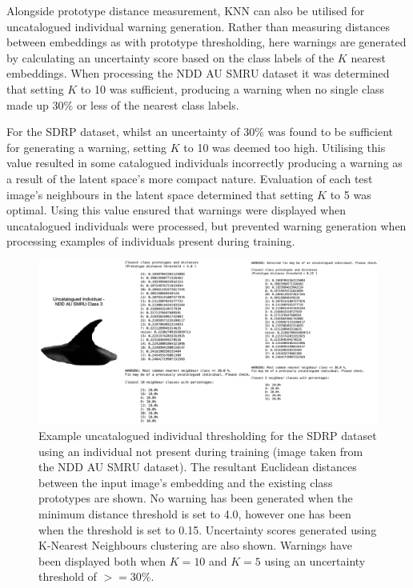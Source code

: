 Alongside prototype distance measurement, KNN can also be utilised for uncatalogued individual warning generation. Rather than measuring distances between embeddings as with prototype thresholding, here warnings are generated by calculating an uncertainty score based on the class labels of the $K$ nearest embeddings. When processing the NDD AU SMRU dataset it was determined that setting $K$ to 10 was sufficient, producing a warning when no single class made up 30\% or less of the nearest class labels. 

For the SDRP dataset, whilst an uncertainty of 30\% was found to be sufficient for generating a warning, setting $K$ to 10 was deemed too high. Utilising this value resulted in some catalogued individuals incorrectly producing a warning as a result of the latent space's more compact nature. Evaluation of each test image's neighbours in the latent space determined that setting $K$ to 5 was optimal. Using this value ensured that warnings were displayed when uncatalogued individuals were processed, but prevented warning generation when processing examples of individuals present during training. 

\begin{figure}[t]
	\begin{center}
		\includegraphics[scale=0.5]{Chapter6/figs/uncatalogued-individual-thresholding.png}
	\end{center}
	\caption[Example uncatalogued individual thresholding for the SDRP dataset using an individual not present during training.]{Example uncatalogued individual thresholding for the SDRP dataset using an individual not present during training (image taken from the NDD AU SMRU dataset). The resultant Euclidean distances between the input image's embedding and the existing class prototypes are shown. No warning has been generated when the minimum distance threshold is set to 4.0, however one has been when the threshold is set to 0.15. Uncertainty scores generated using K-Nearest Neighbours clustering are also shown. Warnings have been displayed both when $K = 10$ and $K = 5$ using an uncertainty threshold of $>=30\%$.}
	\label{fig:uncatalogued-individual-example-sdrp}
\end{figure}

